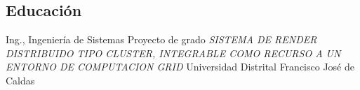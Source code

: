 \documentclass[overlapped,line,final,letterpaper]{res}
\begin{document}
\begin{resume}
%
%
%

\section{\sc Educación}
\vspace{0.5cm}
Ing., Ingeniería de Sistemas
\newline Proyecto de grado \textit{SISTEMA DE RENDER DISTRIBUIDO TIPO CLUSTER, INTEGRABLE COMO RECURSO A UN ENTORNO DE COMPUTACION GRID}
\newline Universidad Distrital Francisco José de Caldas

\vspace{0.25cm}


\end{resume}
\end{document}
